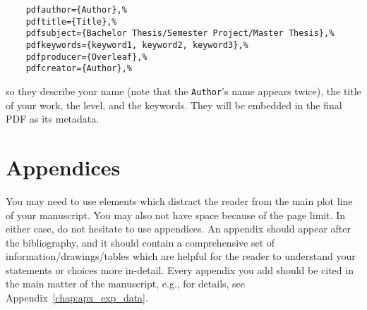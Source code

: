 \begin{verbatim}
    pdfauthor={Author},%
    pdftitle={Title},%
    pdfsubject={Bachelor Thesis/Semester Project/Master Thesis},%
    pdfkeywords={keyword1, keyword2, keyword3},%
    pdfproducer={Overleaf},%
    pdfcreator={Author},%
\end{verbatim}

\noindent so they describe your name (note that the \texttt{Author}'s name appears twice), the title of your work, the level, and the keywords. They will be embedded in the final PDF as its metadata.

\section{\label{sec:res_app}Appendices}%

You may need to use elements which distract the reader from the main plot line of your manuscript. You may also not have space because of the page limit. In either case, do not hesitate to use appendices. An appendix should appear after the bibliography, and it should contain a comprehensive set of information/drawings/tables which are helpful for the reader to understand your statements or choices more in-detail. Every appendix you add should be cited in the main matter of the manuscript, e.g., for details, see Appendix~\ref{chap:apx_exp_data}.